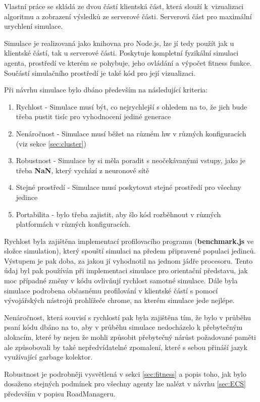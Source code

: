 Vlastní práce se skládá ze dvou částí klientská část, která slouží k~vizualizaci algoritmu a zobrazení výsledků ze serverové části. Serverová část pro maximální urychlení simulace. 

Simulace je realizovaná jako knihovna pro Node.js, lze jí tedy použít jak u klientské částí, tak u serverové části. Poskytuje kompletní fyzikální simulaci agenta, prostředí ve kterém se pohybuje, jeho ovládání a výpočet fitness funkce. Součástí simulačního prostředí je také kód pro její vizualizaci.

Při návrhu simulace bylo dbáno především na následující kriteria:
\begin{enumerate}
	\item Rychlost - Simulace musí být, co nejrychlejší s ohledem na to, že jich bude třeba pustit tisíc pro vyhodnocení jediné generace
	\item Nenáročnost - Simulace musí běžet na různém hw v různých konfiguracích (viz sekce \ref{sec:cluster})
	\item Robustnost - Simulace by si měla poradit s neočekávanými vstupy, jako je třeba \textbf{NaN}, který vychází z neuronové sítě
	\item Stejné prostředí - Simulace musí poskytovat stejné prostředí pro všechny jedince
	\item Portabilita - bylo třeba zajistit, aby šlo kód rozběhnout v různých platformách v různých konfiguracích.
\end{enumerate}

Rychlost byla zajištěna implementací profilovacího programu (\textbf{benchmark.js} ve složce simulation), který spouští simulaci na předem připravené populaci jedinců. Výstupem je pak doba, za jakou jí vyhodnotil na jednom jádře procesoru. Tento údaj byl pak používán při implementaci simulace pro orientační představu, jak moc případné změny v kódu ovlivňují rychlost samotné simulace. Dále byla simulace podrobena občasnému profilování v klientské částí s pomocí vývojářských nástrojů prohlížeče chrome, na kterém simulace jede nejlépe.

Nenáročnost, která souvisí s rychlostí pak byla zajištěna tím, že bylo v průběhu psaní kódu dbáno na to, aby v průběhu simulace nedocházelo k přebytečným alokacím, které by nejen že mohli způsobit přebytečný nárůst požadované paměti ale způsobovali by také nepředvídatelné zpomalení, které s sebou přináší jazyk využívající garbage kolektor.

Robustnost je podrobněji vysvětlená v sekci \ref{sec:fitness} a popis toho, jak bylo dosaženo stejných podmínek pro všechny agenty lze nalézt v návrhu \ref{sec:ECS} především v popisu RoadManageru.

